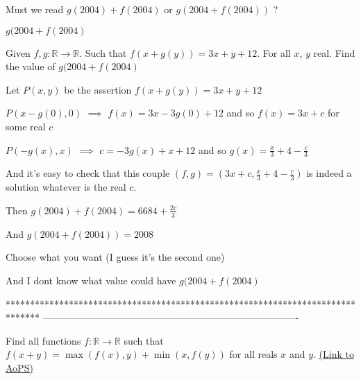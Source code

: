 \begin{solution}
	\begin{tcolorbox}Must we read  $g(2004) +f(2004)$ or $g(2004 +f(2004))$ ?\end{tcolorbox}

$g(2004 +f(2004)$
\end{solution}






\begin{solution}
	\begin{tcolorbox}Given $f,g : \mathbb{R} \rightarrow \mathbb{R}$. Such that $f(x+ g(y)) = 3x + y + 12$. For all $x$, $y$ real. Find the value of $g(2004 +f(2004)$\end{tcolorbox}
Let $P(x,y)$ be the assertion $f(x+g(y))=3x+y+12$

$P(x-g(0),0)$ $\implies$ $f(x)=3x-3g(0)+12$ and so $f(x)=3x+c$ for some real $c$

$P(-g(x),x)$ $\implies$ $c=-3g(x)+x+12$ and so $g(x)=\frac x3+4-\frac c3$

And it's easy to check that this couple $(f,g)=(3x+c,\frac x3+4-\frac c3)$ is indeed a solution whatever is the real $c$.

Then $\boxed{g(2004)+f(2004)=6684+\frac {2c}3}$

And $\boxed{g(2004+f(2004))=2008}$

Choose what you want (I guess it's the second one)

And I dont know what value could have $g(2004+f(2004)$
\end{solution}
*******************************************************************************
-------------------------------------------------------------------------------

\begin{problem}
	Find all functions $f:\mathbb{R}\to\mathbb{R}$ such that $f(x+y)=\max(f(x),y)+\min(x,f(y))$ for all reals $x$ and $y$.
	\flushright \href{https://artofproblemsolving.com/community/c6h406771}{(Link to AoPS)}
\end{problem}



